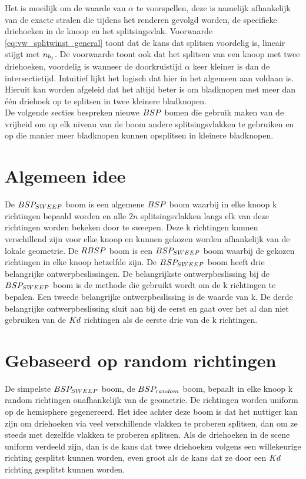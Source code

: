 Het is moeilijk om de waarde van $\alpha$ te voorspellen, deze is namelijk afhankelijk van de exacte stralen die tijdens het renderen gevolgd worden, de specifieke driehoeken in de knoop en het splitsingsvlak. 
Voorwaarde \ref{eq:vw_splitwinst_general} toont dat de kans dat splitsen voordelig is, lineair stijgt met $n_{b_j}$. 
De voorwaarde toont ook dat het splitsen van een knoop met twee driehoeken, voordelig is wanneer de doorkruistijd $\alpha$ keer kleiner is dan de intersectietijd. 
Intuitief lijkt het logisch dat hier in het algemeen aan voldaan is. 
Hieruit kan worden afgeleid dat het altijd beter is om bladknopen met meer dan één driehoek op te splitsen in twee kleinere bladknopen.\\

De volgende secties bespreken nieuwe $BSP$ bomen die gebruik maken van de vrijheid om op elk niveau van de boom andere splitsingsvlakken te gebruiken en op die manier meer bladknopen kunnen opsplitsen in kleinere bladknopen.\\



\section{Algemeen idee}
    De $BSP_{SWEEP}$ boom is een algemene $BSP$ boom waarbij in elke knoop k richtingen bepaald worden en alle $2n$ splitsingsvlakken langs elk van deze richtingen worden bekeken door te sweepen.
    Deze k richtingen kunnen verschillend zijn voor elke knoop en kunnen gekozen worden afhankelijk van de lokale geometrie.
    De $RBSP$ boom is een $BSP_{SWEEP}$ boom waarbij de gekozen richtingen in elke knoop hetzelfde zijn.
    De $BSP_{SWEEP}$ boom heeft drie belangrijke ontwerpbeslissingen.
    De belangrijkste ontwerpbeslissing bij de $BSP_{SWEEP}$ boom is de methode die gebruikt wordt om de k richtingen te bepalen.
    Een tweede belangrijke ontwerpbeslissing is de waarde van k.
    De derde belangrijke ontwerpbeslissing sluit aan bij de eerst en gaat over het al dan niet gebruiken van de $Kd$ richtingen als de eerste drie van de k richtingen.
    \\


\section{Gebaseerd op random richtingen}
De simpelste $BSP_{SWEEP}$ boom, de $BSP_{random}$ boom, bepaalt in elke knoop k random richtingen onafhankelijk van de geometrie.
De richtingen worden uniform op de hemisphere gegenereerd.
Het idee achter deze boom is dat het nuttiger kan zijn om driehoeken via veel verschillende vlakken te proberen splitsen, dan om ze steeds met dezelfde vlakken te proberen splitsen.
Als de driehoeken in de scene uniform verdeeld zijn, dan is de kans dat twee driehoeken volgens een willekeurige richting gesplitst kunnen worden, even groot als de kans dat ze door een $Kd$ richting gesplitst kunnen worden.\\

